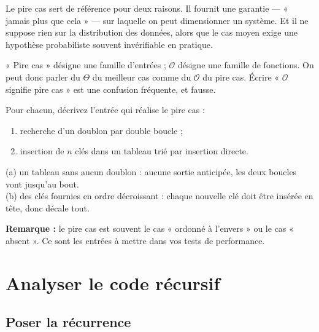 \documentclass[11pt,a4paper]{article}
\newcommand{\bigO}{\mathcal{O}}
\newcommand{\bigTheta}{\Theta}
\theoremstyle{definition}
\theoremstyle{remark}
\begin{document}
Le pire cas sert de référence pour deux raisons. Il fournit une garantie
--- « jamais plus que cela » --- sur laquelle on peut dimensionner un
système. Et il ne suppose rien sur la distribution des données, alors que le
cas moyen exige une hypothèse probabiliste souvent invérifiable en pratique.

\begin{attentionbox}
« Pire cas » désigne une famille d'entrées ; $\bigO$ désigne une famille de
fonctions. On peut donc parler du $\bigTheta$ du meilleur cas comme du
$\bigO$ du pire cas. Écrire « $\bigO$ signifie pire cas » est une confusion
fréquente, et fausse.
\end{attentionbox}

\begin{appliboxQ}
Pour chacun, décrivez l'entrée qui réalise le pire cas :
\begin{enumerate}[nosep,label=(\alph*)]
    \item recherche d'un doublon par double boucle ;
    \item insertion de $n$ clés dans un tableau trié par insertion directe.
\end{enumerate}
\end{appliboxQ}

\begin{appliboxR}[Réponse]
(a) un tableau sans aucun doublon : aucune sortie anticipée, les deux
boucles vont jusqu'au bout.\\
(b) des clés fournies en ordre décroissant : chaque nouvelle clé doit être
insérée en tête, donc décale tout.

\textbf{Remarque :} le pire cas est souvent le cas « ordonné à l'envers »
ou le cas « absent ». Ce sont les entrées à mettre dans vos tests de
performance.
\end{appliboxR}

\section{Analyser le code récursif}

\subsection{Poser la récurrence}
\end{document}
